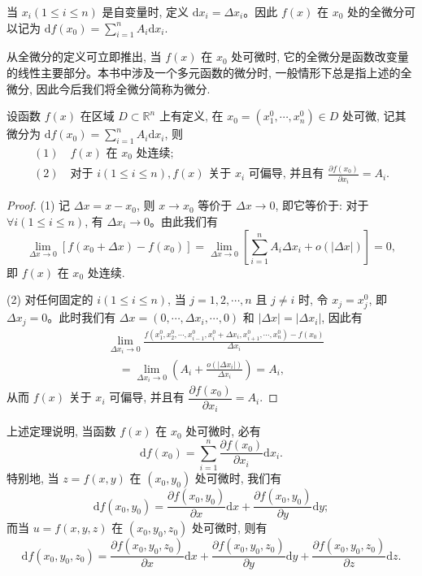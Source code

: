 当 $x_i(1\leqslant i\leqslant n)$ 是自变量时, 定义 $\mathrm dx_i=\Delta x_i$。因此 $f(x)$ 在 $x_0$ 处的全微分可以记为 $\mathrm df(x_0)=\sum\limits_{i=1}^n A_i\mathrm dx_i$.

从全微分的定义可立即推出, 当 $f(x)$ 在 $x_0$ 处可微时, 它的全微分是函数改变量的线性主要部分。本书中涉及一个多元函数的微分时, 一般情形下总是指上述的全微分, 因此今后我们将全微分简称为微分.

\begin{theorem}\label{theorem:ma-14-1-1}
设函数 $f(x)$ 在区域 $D\subset\mathbb R^n$ 上有定义, 在 $x_0=(x_1^0,\cdots,x_n^0)\in D$ 处可微, 记其微分为 $\mathrm df(x_0)=\sum\limits_{i=1}^n A_i\mathrm dx_i$, 则
\[
\begin{gathered}
  (1)\quad f(x)\text{ 在 }x_0\text{ 处连续};\\
  (2)\quad \text{对于 } i(1\leqslant i\leqslant n), f(x)\text{ 关于 }x_i\text{ 可偏导, 并且有 }
  \frac{\partial f(x_0)}{\partial x_i}=A_i.
\end{gathered}
\]
\end{theorem}


\begin{proof}
(1) 记 $\Delta x=x-x_0$, 则 $x\to x_0$ 等价于 $\Delta x\to0$, 即它等价于: 对于 $\forall i(1\leqslant i\leqslant n)$, 有 $\Delta x_i\to0$。由此我们有
\[
  \lim_{\Delta x\to0}[f(x_0+\Delta x)-f(x_0)]
  =
  \lim_{\Delta x\to0}\left[\sum_{i=1}^n A_i\Delta x_i+o(|\Delta x|)\right]=0,
\]
即 $f(x)$ 在 $x_0$ 处连续.

(2) 对任何固定的 $i(1\leqslant i\leqslant n)$, 当 $j=1,2,\cdots,n$ 且 $j\ne i$ 时, 令 $x_j=x_j^0$, 即 $\Delta x_j=0$。此时我们有 $\Delta x=(0,\cdots,\Delta x_i,\cdots,0)$ 和 $|\Delta x|=|\Delta x_i|$, 因此有
\[
\begin{aligned}
&\lim_{\Delta x_i\to0}
  \frac{f(x_1^0,x_2^0,\cdots,x_{i-1}^0,x_i^0+\Delta x_i,x_{i+1}^0,\cdots,x_n^0)-f(x_0)}{\Delta x_i}\\
&\quad =
  \lim_{\Delta x_i\to0}\left(A_i+\frac{o(|\Delta x_i|)}{\Delta x_i}\right)=A_i,
\end{aligned}
\]
从而 $f(x)$ 关于 $x_i$ 可偏导, 并且有 $\dfrac{\partial f(x_0)}{\partial x_i}=A_i$.
\end{proof}


上述定理说明, 当函数 $f(x)$ 在 $x_0$ 处可微时, 必有
\[
  \mathrm df(x_0)=\sum_{i=1}^n\frac{\partial f(x_0)}{\partial x_i}\mathrm dx_i.
\]
特别地, 当 $z=f(x,y)$ 在 $(x_0,y_0)$ 处可微时, 我们有
\[
  \mathrm df(x_0,y_0)=\frac{\partial f(x_0,y_0)}{\partial x}\mathrm dx+
  \frac{\partial f(x_0,y_0)}{\partial y}\mathrm dy;
\]
而当 $u=f(x,y,z)$ 在 $(x_0,y_0,z_0)$ 处可微时, 则有
\[
  \mathrm df(x_0,y_0,z_0)=
  \frac{\partial f(x_0,y_0,z_0)}{\partial x}\mathrm dx+
  \frac{\partial f(x_0,y_0,z_0)}{\partial y}\mathrm dy+
  \frac{\partial f(x_0,y_0,z_0)}{\partial z}\mathrm dz.
\]

